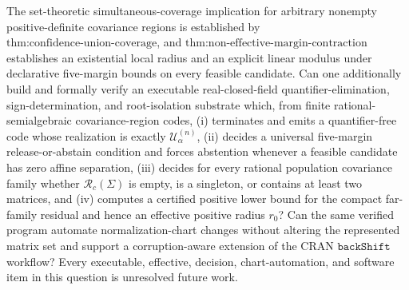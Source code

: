 The set-theoretic simultaneous-coverage implication for arbitrary nonempty positive-definite covariance regions is established by \(\text{thm:confidence-union-coverage}\), and \(\text{thm:non-effective-margin-contraction}\) establishes an existential local radius and an explicit linear modulus under declarative five-margin bounds on every feasible candidate. Can one additionally build and formally verify an executable real-closed-field quantifier-elimination, sign-determination, and root-isolation substrate which, from finite rational-semialgebraic covariance-region codes, (i) terminates and emits a quantifier-free code whose realization is exactly \(\mathcal U^{(n)}_\alpha\), (ii) decides a universal five-margin release-or-abstain condition and forces abstention whenever a feasible candidate has zero affine separation, (iii) decides for every rational population covariance family whether \(\mathcal R_c(\Sigma)\) is empty, is a singleton, or contains at least two matrices, and (iv) computes a certified positive lower bound for the compact far-family residual and hence an effective positive radius \(r_0\)? Can the same verified program automate normalization-chart changes without altering the represented matrix set and support a corruption-aware extension of the CRAN \(\texttt{backShift}\) workflow? Every executable, effective, decision, chart-automation, and software item in this question is unresolved future work.
